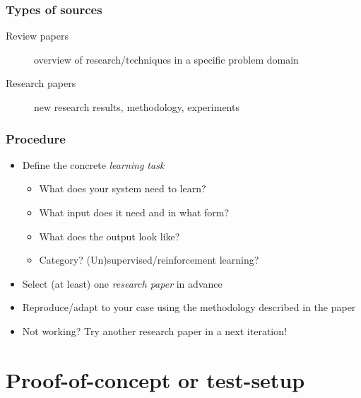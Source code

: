 \documentclass[aspectratio=169]{beamer}
\begin{document}
\begin{frame}
  \frametitle{Types of sources}

  \begin{description}
    \item[Review papers] overview of research/techniques in a specific problem domain
    \item[Research papers] new research results, methodology, experiments
  \end{description}

\end{frame}

\begin{frame}[plain]
  \frametitle{Procedure}

  \begin{itemize}
    \item Define the concrete \textit{learning task}
    \begin{itemize}
      \item What does your system need to learn?
      \item What input does it need and in what form?
      \item What does the output look like?
      \item Category? (Un)supervised/reinforcement learning?
    \end{itemize}
    \item Select (at least) one \textit{research paper} in advance
    \item Reproduce/adapt to your case using the methodology described in the paper
    \item Not working? Try another research paper in a next iteration!
  \end{itemize}

\end{frame}

\section{Proof-of-concept or test-setup}
\end{document}

